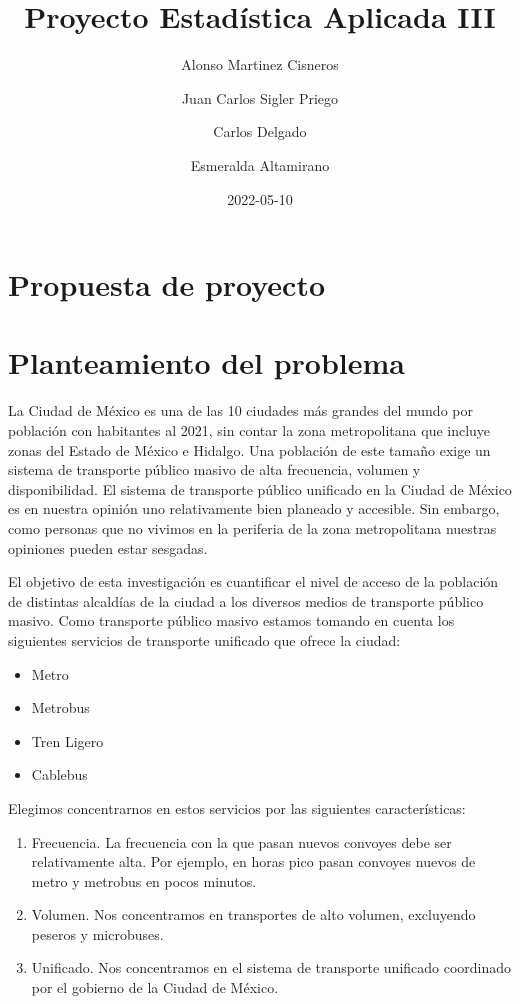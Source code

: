 \documentclass[
  spanish,
]{article}
\title{Proyecto Estadística Aplicada III}
\author{Alonso Martinez Cisneros \and Juan Carlos Sigler
Priego \and Carlos Delgado \and Esmeralda Altamirano}
\date{2022-05-10}
\providecommand{\tightlist}{%
  \setlength{\itemsep}{0pt}\setlength{\parskip}{0pt}}
\begin{document}
\maketitle

\hypertarget{propuesta-de-proyecto}{%
\section{Propuesta de proyecto}\label{propuesta-de-proyecto}}

\hypertarget{planteamiento-del-problema}{%
\section{Planteamiento del problema}\label{planteamiento-del-problema}}

La Ciudad de México es una de las 10 ciudades más grandes del mundo por
población con habitantes al 2021, sin contar la zona metropolitana que
incluye zonas del Estado de México e Hidalgo. Una población de este
tamaño exige un sistema de transporte público masivo de alta frecuencia,
volumen y disponibilidad. El sistema de transporte público unificado en
la Ciudad de México es en nuestra opinión uno relativamente bien
planeado y accesible. Sin embargo, como personas que no vivimos en la
periferia de la zona metropolitana nuestras opiniones pueden estar
sesgadas.

El objetivo de esta investigación es cuantificar el nivel de acceso de
la población de distintas alcaldías de la ciudad a los diversos medios
de transporte público masivo. Como transporte público masivo estamos
tomando en cuenta los siguientes servicios de transporte unificado que
ofrece la ciudad:

\begin{itemize}
\tightlist
\item
  Metro
\item
  Metrobus
\item
  Tren Ligero
\item
  Cablebus
\end{itemize}

Elegimos concentrarnos en estos servicios por las siguientes
características:

\begin{enumerate}
\def\labelenumi{\arabic{enumi}.}
\item
  Frecuencia. La frecuencia con la que pasan nuevos convoyes debe ser
  relativamente alta. Por ejemplo, en horas pico pasan convoyes nuevos
  de metro y metrobus en pocos minutos.
\item
  Volumen. Nos concentramos en transportes de alto volumen, excluyendo
  peseros y microbuses.
\item
  Unificado. Nos concentramos en el sistema de transporte unificado
  coordinado por el gobierno de la Ciudad de México.
\end{enumerate}
\end{document}
